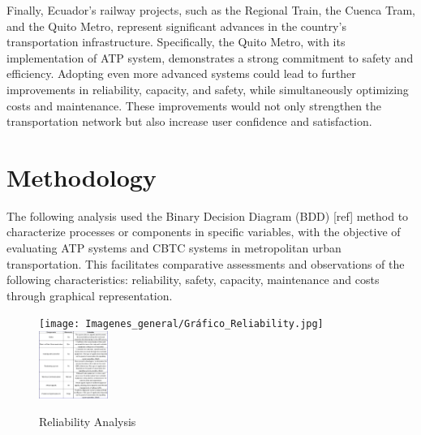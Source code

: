 \documentclass[conference]{IEEEtran}
\begin{document}
Finally, Ecuador's railway projects, such as the Regional Train, the Cuenca Tram, and the Quito Metro, represent significant advances in the country's transportation infrastructure. Specifically, the Quito Metro, with its implementation of ATP system, demonstrates a strong commitment to safety and efficiency. Adopting even more advanced systems could lead to further improvements in reliability, capacity, and safety, while simultaneously optimizing costs and maintenance. These improvements would not only strengthen the transportation network but also increase user confidence and satisfaction.


\section{Methodology}
The following analysis used the Binary Decision Diagram (BDD) [ref] method to characterize processes or components in specific variables, with the objective of evaluating ATP systems and CBTC systems in metropolitan urban transportation. This facilitates comparative assessments and observations of the following characteristics: reliability, safety, capacity, maintenance and costs through graphical representation.
\begin{figure}[h]
 \centering
        \texttt{[image: Imagenes\_general/Gráfico\_Reliability.jpg]}
        \includegraphics[width=0.20\textwidth,scale=1]{Imagenes_general/Rliability_tabla.jpg}
\caption{Reliability Analysis}
 \label{fig:Reliability Analysis}
\end{figure}
\end{document}
